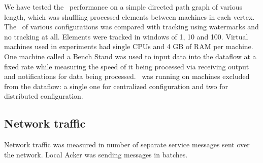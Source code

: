 \label {fs-acker-experiments}

We have tested the \tracker\ performance on a simple directed path graph of various length, which was shuffling processed elements between machines in each vertex. The \tracker\ of various configurations was compared with  tracking using watermarks and no tracking at all. Elements were tracked in windows of 1, 10 and 100.
Virtual machines used in experiments had single CPUs and 4 GB of RAM per machine. One machine called a Bench Stand was used to input data into the dataflow at a fixed rate while measuring the speed of it being processed via receiving output and notifications for data being processed. \tracker\ was running on machines excluded from the dataflow: a single one for centralized configuration and two for distributed configuration.

\subsection{Network traffic}

Network traffic was measured in number of separate service messages sent over the network. Local Acker was sending messages in batches.

